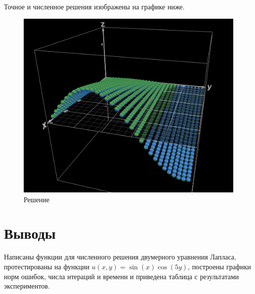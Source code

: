 \documentclass{article}
\begin{document}
Точное и численное решения изображены на графике ниже.

\begin{figure}[h!]
    \centering
    \includegraphics[width=0.8\linewidth]{data/sol.png}
    \caption{Решение}
    \label{fig:enter-label}
\end{figure}

\section{Выводы}

Написаны функции для численного решения двумерного уравнения Лапласа, протестированы на функции $u(x, y) = \sin (x) \cos(5y)$, построены графики норм ошибок, числа итераций и времени и приведена таблица с результатами экспериментов.
\end{document}
